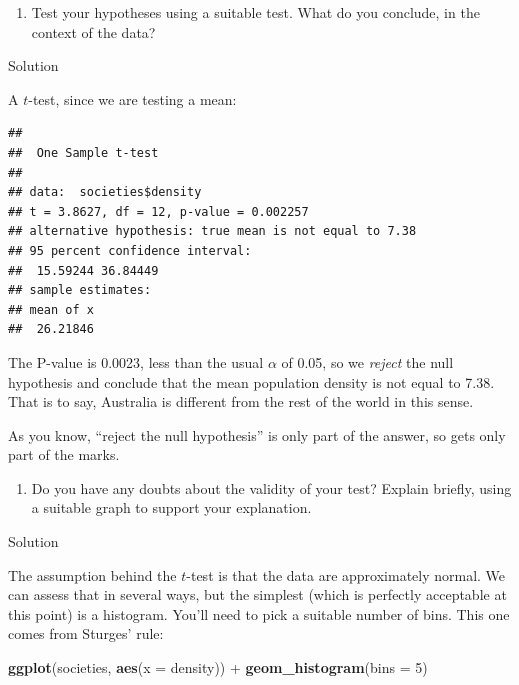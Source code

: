 \documentclass[]{tufte-book}
\newenvironment{Shaded}{}{}
\newcommand{\DataTypeTok}[1]{\textcolor[rgb]{0.56,0.13,0.00}{#1}}
\newcommand{\DecValTok}[1]{\textcolor[rgb]{0.25,0.63,0.44}{#1}}
\newcommand{\FloatTok}[1]{\textcolor[rgb]{0.25,0.63,0.44}{#1}}
\newcommand{\KeywordTok}[1]{\textcolor[rgb]{0.00,0.44,0.13}{\textbf{#1}}}
\newcommand{\NormalTok}[1]{#1}
\newcommand{\OperatorTok}[1]{\textcolor[rgb]{0.40,0.40,0.40}{#1}}
\newcommand{\StringTok}[1]{\textcolor[rgb]{0.25,0.44,0.63}{#1}}
\providecommand{\tightlist}{%
  \setlength{\itemsep}{0pt}\setlength{\parskip}{0pt}}
\theoremstyle{definition}
\theoremstyle{definition}
\theoremstyle{definition}
\theoremstyle{remark}
\begin{document}
\begin{enumerate}
\def\labelenumi{(\alph{enumi})}
\setcounter{enumi}{2}
\tightlist
\item
  Test your hypotheses using a suitable test. What do you conclude, in
  the context of the data?
\end{enumerate}

Solution

A \(t\)-test, since we are testing a mean:

\begin{Shaded}
\end{Shaded}

\begin{verbatim}
## 
##  One Sample t-test
## 
## data:  societies$density
## t = 3.8627, df = 12, p-value = 0.002257
## alternative hypothesis: true mean is not equal to 7.38
## 95 percent confidence interval:
##  15.59244 36.84449
## sample estimates:
## mean of x 
##  26.21846
\end{verbatim}

The P-value is 0.0023, less than the usual \(\alpha\) of 0.05, so we
\emph{reject} the null hypothesis and conclude that the mean population
density is not equal to 7.38. That is to say, Australia is different
from the rest of the world in this sense.

As you know, ``reject the null hypothesis'' is only part of the answer,
so gets only part of the marks.

\begin{enumerate}
\def\labelenumi{(\alph{enumi})}
\setcounter{enumi}{3}
\tightlist
\item
  Do you have any doubts about the validity of your test? Explain
  briefly, using a suitable graph to support your explanation.
\end{enumerate}

Solution

The assumption behind the \(t\)-test is that the data are approximately
normal. We can assess that in several ways, but the simplest (which is
perfectly acceptable at this point) is a histogram. You'll need to pick
a suitable number of bins. This one comes from Sturges' rule:

\begin{Shaded}
\begin{Highlighting}[]
\KeywordTok{ggplot}\NormalTok{(societies, }\KeywordTok{aes}\NormalTok{(}\DataTypeTok{x =}\NormalTok{ density)) }\OperatorTok{+}\StringTok{ }\KeywordTok{geom_histogram}\NormalTok{(}\DataTypeTok{bins =} \DecValTok{5}\NormalTok{)}
\end{Highlighting}
\end{Shaded}
\end{document}
